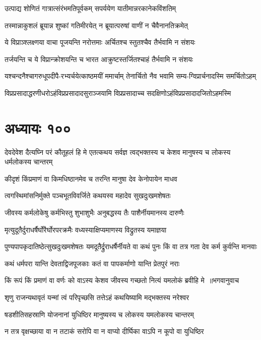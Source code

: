 \twolineshloka
{उत्पाद्य शोणितं गात्रात्संरंभमतिपूर्वकम्}
{सपर्ययेण यातीमान्नरकानेकविंशतिम्}


\twolineshloka
{तस्मान्नाकुशलं ब्रूयान्न शुष्कां गतिमीरयेत्}
{न ब्रूयात्परुषां वाणीं न चैवैनानतिक्रमेत्}


\twolineshloka
{ये विप्राञ्श्लक्ष्णया वाचा पूजयन्ति नरोत्तमाः}
{अर्चितश्च स्तुतश्चैव तैर्भवामि न संशयः}


\twolineshloka
{तर्जयन्ति च ये विप्रान्क्रोशयन्ति च भारत}
{आक्रुष्टस्तर्जितश्चाहं तैर्भवामि न संशयः}


\twolineshloka
{यश्चन्दनैश्चागरुधूपदीपै-रभ्यर्चयेत्काष्ठमयीं ममार्चाम्}
{तेनार्चितो नैव भवामि सम्य-ग्विप्रार्चनादस्मि समर्चितोऽहम्}


\twolineshloka
{विप्रप्रसादाद्धरणीधरोऽहंविप्रप्रसादादसुराञ्जयामि}
{विप्रप्रसादाच्च सदक्षिणोऽहंविप्रप्रसादादजितोऽहमस्मि}


\chapter{अध्यायः १००}
\threelineshloka
{देवदेवेश दैत्यघ्नि परं कौतूहलं हि मे}
{एतत्कथय सर्वज्ञ त्वद्भक्तस्य च केशव}
{मानुषस्य च लोकस्य धर्मलोकस्य चान्तरम्}


\twolineshloka
{कीदृशं किंप्रमाणं वा किमधिष्ठानमेव च}
{तरन्ति मानुषा देव केनोपायेन माधव}


\twolineshloka
{त्वगस्थिमांसनिर्मुक्ते पञ्चभूतविवर्जिते}
{कथयस्व महादेव सुखदुःखमशेषतः}


\twolineshloka
{जीवस्य कर्मलोकेषु कर्मभिस्तु शुभाशुभैः}
{अनुबद्धस्य तैः पाशैर्नीयमानस्य दारुणैः}


\twolineshloka
{मृत्युदूतैर्दुराधर्षैर्घोरैर्घोरपरक्रमैः}
{वध्यस्याक्षिप्यमाणस्य विद्रुतस्य यमाज्ञया}


\threelineshloka
{पुण्यपापकृदातिष्ठेत्सुखदुःखमशेषतः}
{यमदूतैर्द्रुराधर्षैर्नीयते वा कथं पुनः}
{किं वा तत्र गता देव कर्म कुर्वन्ति मानवाः}


\twolineshloka
{कथं धर्मपरा यान्ति देवताद्विजपूजकाः}
{कतं वा पापकर्माणो यान्ति प्रेतपुरं नराः}


\threelineshloka
{किं रूपं किं प्रमाणं वा वर्णः को वाऽस्य केशव}
{जीवस्य गच्छतो नित्यं यमलोकं ब्रवीहि मे ॥भगवानुवाच}
{}


\twolineshloka
{शृणु राजन्यथावृतं यन्मां त्वं परिपृच्छसि}
{तत्तेऽहं कथयिष्यामि मद्भक्तस्य नरेश्वर}


\twolineshloka
{षडशीतिसहस्राणि योजनानां युधिष्ठिर}
{मानुष्यस्य च लोकस्य यमलोकस्य चान्तरम्}


\twolineshloka
{न तत्र वृक्षच्छाया वा न तटाकं सरोपि वा}
{न वाप्यो दीर्घिका वाऽपि न कूपो वा युधिष्ठिर}


